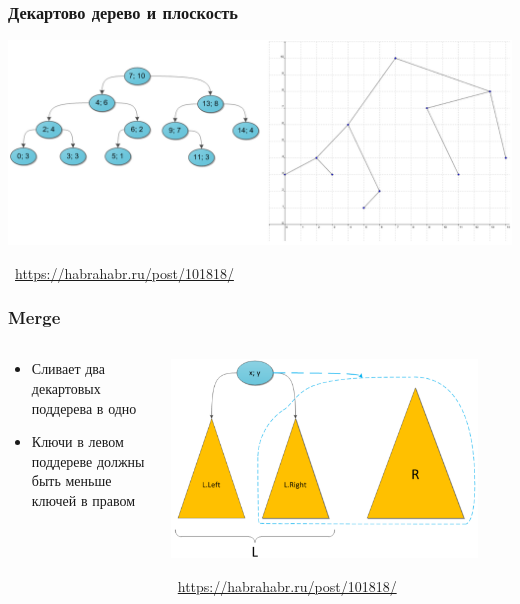 \documentclass[xetex,mathserif,serif]{beamer}
\newcommand{\attribution}[1] {
	\begin{flushright}\begin{scriptsize}\textcolor{gray}{\textcopyright\, #1}\end{scriptsize}\end{flushright}
}
\begin{document}
	\begin{frame}
		\frametitle{Декартово дерево и плоскость}
		\begin{center}
			\includegraphics[width=\textwidth]{treapAndPlane.png}
		\end{center}
		\attribution{\url{https://habrahabr.ru/post/101818/}}
	\end{frame}

	\begin{frame}
		\frametitle{Merge}
		\begin{columns}
			\begin{column}{0.5\textwidth}
				\begin{itemize}
					\item Сливает два декартовых поддерева в одно
					\item Ключи в левом поддереве должны быть меньше ключей в правом
				\end{itemize}
			\end{column}
			\begin{column}{0.5\textwidth}
				\includegraphics[width=0.9\textwidth]{treapMerge.png}
				\attribution{\url{https://habrahabr.ru/post/101818/}}
			\end{column}
		\end{columns}
	\end{frame}
\end{document}
